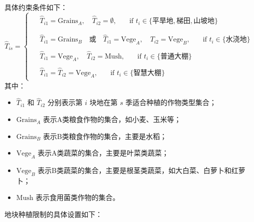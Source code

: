 \documentclass[12pt,a4paper]{nmmcm}
\begin{document}
具体约束条件如下：
\[
  \hat{T}_{is} =
  \begin{cases}
    \begin{aligned}
       & \hat{T}_{i1} = \text{Grains}_A, \quad \hat{T}_{i2} = \emptyset, \quad & \text{if } t_i \in \{\text{平旱地}, \text{梯田}, \text{山坡地}\} \\
    \end{aligned}                                \\
    \begin{aligned}
       & \hat{T}_{i1} = \text{Grains}_B \quad \text{或} \quad \hat{T}_{i1} = \text{Vege}_A, \quad \hat{T}_{i2} = \text{Vege}_B, \quad & \text{if } t_i \in \{\text{水浇地}\}
    \end{aligned} \\
    \begin{aligned}
       & \hat{T}_{i1} = \text{Vege}_A, \quad \hat{T}_{i2} = \text{Mush}, \quad & \text{if } t_i \in \{\text{普通大棚}\}
    \end{aligned}                                                      \\
    \begin{aligned}
       & \hat{T}_{i1} = \hat{T}_{i2} = \text{Vege}_A, \quad & \text{if } t_i \in \{\text{智慧大棚}\}
    \end{aligned}
  \end{cases}
\]
其中：
\begin{itemize}
  \item $\hat{T}_{i1}$ 和 $\hat{T}_{i2}$ 分别表示第 $i$ 块地在第 $s$ 季适合种植的作物类型集合；
  \item $\text{Grains}_A$ 表示A类粮食作物的集合，如小麦、玉米等；
  \item $\text{Grains}_B$ 表示B类粮食作物的集合，主要是水稻；
  \item $\text{Vege}_A$ 表示A类蔬菜的集合，主要是叶菜类蔬菜；
  \item $\text{Vege}_B$ 表示B类蔬菜的集合，主要是根茎类蔬菜，如大白菜、白萝卜和红萝卜；
  \item $\text{Mush}$ 表示食用菌类作物的集合。
\end{itemize}
地块种植限制的具体设置如下：
\end{document}
